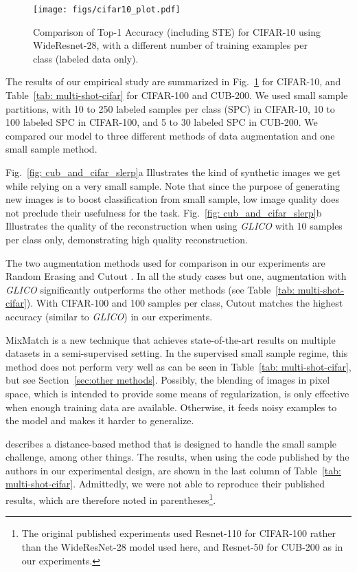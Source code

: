 \documentclass[a4paper,conference]{IEEEtran}
\begin{document}
\begin{figure}[htbp]
	\centering

	\texttt{[image: figs/cifar10\_plot.pdf]}

	\caption{Comparison of  Top-1 Accuracy (including STE) for CIFAR-10 using WideResnet-28, with a different number of training examples per class (labeled data only).}
	\label{fig: cifar10}
	\vskip -0.2in
\end{figure}

The results of our empirical study are summarized in Fig.~\ref{fig: cifar10} for CIFAR-10, and Table~\ref{tab: multi-shot-cifar} for CIFAR-100 and CUB-200. We used small sample partitions, with 10 to 250 labeled samples per class (SPC) in CIFAR-10, 10 to 100 labeled SPC in CIFAR-100, and 5 to 30 labeled SPC in CUB-200. We compared our model to three different methods of data augmentation and one small sample method. 

Fig.~\ref{fig: cub_and_cifar_slerp}a Illustrates the kind of synthetic images we get while relying on a very small sample. Note that since the purpose of generating new images is to boost classification from small sample, low image quality does not preclude their usefulness for the task. Fig.~\ref{fig: cub_and_cifar_slerp}b Illustrates the quality of the reconstruction when using \textit{GLICO} with 10 samples per class only, demonstrating high quality reconstruction. 
		
The two augmentation methods used for comparison in our experiments are Random Erasing \cite{randomerasing} and Cutout \cite{devries2017improved}. In all the study cases but one, augmentation with \textit{GLICO} significantly outperforms the other methods (see Table~\ref{tab: multi-shot-cifar}). With CIFAR-100 and 100 samples per class, Cutout matches the highest accuracy (similar to \textit{GLICO}) in our experiments.

MixMatch \cite{berthelot2019mixmatch} is a new technique that achieves state-of-the-art results on multiple datasets in a semi-supervised setting. In the supervised small sample regime, this method does not perform very well as can be seen in Table~\ref{tab: multi-shot-cifar}, but see Section~\ref{sec:other methods}. Possibly, the blending of images in pixel space, which is intended to provide some means of regularization, is only effective when enough training data are available. Otherwise, it feeds noisy examples to the model and makes it harder to generalize.

\cite{cosinesmalldata} describes a distance-based method that is designed to handle the small sample challenge, among other things. The results, when using the code published by the authors in our experimental design, are shown in the last column of Table~\ref{tab: multi-shot-cifar}. Admittedly, we were not able to reproduce their published results, which are therefore noted in parentheses\footnote{The original published experiments used Resnet-110 for CIFAR-100 rather than the WideResNet-28 model used here, and Resnet-50 for CUB-200 as in our experiments.}.
\end{document}
